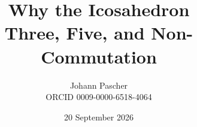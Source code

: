\documentclass[11pt,a4paper]{report}
\title{Why the Icosahedron\\[0.5em]\large Three, Five, and Non-Commutation}
\date{20 September 2026}
\author{Johann Pascher\\\small ORCID 0009-0000-6518-4064}
\begin{document}
\renewcommand{\thechapter}{}
\renewcommand{\thesection}{\arabic{section}}
\maketitle
\tableofcontents

\end{document}
